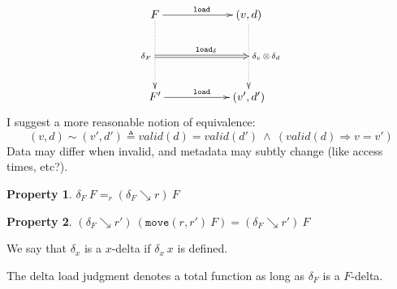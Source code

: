 \documentclass[10pt,twoside,a4paper]{article}
\theoremstyle{theorem}
\theoremstyle{lemma}
\theoremstyle{property}
\newtheorem{property}{Property}[section]
\begin{document}
\begin{displaymath}
	\xymatrix@=2cm{
	F\ar@{->}[r]^{\mathtt{load}}
	\ar@{..>}[d]_{\delta_F}="a"
	& (v,d)\ar@{..>}[d]^{\delta_v \,\otimes\, \delta_d}="b"\\
	F' \ar@{->}[r]^{\mathtt{load}}
	& (v',d')
	\ar@{=>}^{\mathtt{load_\delta}}"a";"b"
	}
\end{displaymath}
I suggest a more reasonable notion of equivalence:
\begin{displaymath}
	(v,d) \sim (v',d') \triangleq valid(d)=valid(d') ~\wedge~ (valid(d) \Rightarrow v = v')
\end{displaymath}
Data may differ when invalid, and metadata may subtly change (like access times, etc?).

\begin{property}
	$\delta_F ~ F =_r (\delta_F \searrow r) ~ F$
\label{prop:deltaFUnder1}
\end{property}

\begin{property}
	$(\delta_F \searrow r') ~ (\mathtt{move}(r,r') ~ F) = (\delta_F \searrow r') ~ F$
\label{prop:deltaFUnder2}
\end{property}

We say that $\delta_x$ is a $x$-delta if $\delta_x ~ x$ is defined.

The delta load judgment denotes a total function as long as $\delta_F$ is a $F$-delta.
\end{document}
